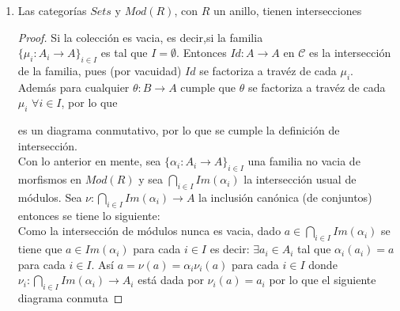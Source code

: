 \documentclass{article}
\begin{document}
\begin{enumerate}[label=\textbf{Ej \arabic*.}]
\begin{proof}
Por último, si $\eta:A_2\times^AA_1\longrightarrow P$ es otro morfismo tal que \\$\eta\mu_1=\beta_1$\,\,y\,\,$\eta\mu_2=\beta_2$, entonces
para cada $(a,b)\in A_2\times^AA_1$
\begin{align*}
\eta(a,b)=\eta[(a,0)+(0,b)]\\
=\eta[\mu_2(a)+\mu_1(b)]\\
=\eta(\mu_2(a))+\eta(\mu_1(b))\\
=\beta_2(a)+\beta_1(b)\\
=\gamma(a,b)
\end{align*}
Por lo que $\gamma=\eta$.
\end{proof}

\item Las categorías $Sets$ y $Mod(R)$, con $R$ un anillo, tienen intersecciones
\begin{proof}
Si la colección es vacia, es decir,si la familia \\ $\{\mu_i\colon A_i\longrightarrow A\}_{i\in I}$ es tal que $I=\emptyset$. Entonces 
$Id\colon A\longrightarrow A$ en $\mathscr{C}$ es la intersección de la familia, pues (por vacuidad) $Id$ se factoriza a travéz de cada $\mu_i$.\\
Además para cualquier $\theta\colon B\longrightarrow A$ cumple que  $\theta$ se factoriza a travéz de cada $\mu_i\,\,\forall i\in I$, por lo que

\centerline{}

es un diagrama conmutativo, por lo que se cumple la definición de intersección.\\

Con lo anterior en mente, sea $\{\alpha_i\colon A_i\longrightarrow A\}_{i\in I}$ una familia no vacia de morfismos en $Mod(R)$ y sea 
$\displaystyle\bigcap_{i\in I}Im(\alpha_i)$ la intersección usual de módulos. 
Sea $\nu\colon \displaystyle\bigcap_{i\in I}Im(\alpha_i)\longrightarrow A$ la inclusión canónica (de conjuntos) entonces
se tiene lo siguiente:\\

Como la intersección de módulos nunca es vacia, dado $a\in\displaystyle\bigcap_{i\in I}Im(\alpha_i)$ se tiene que 
$a\in Im(\alpha_i)$ para cada $i\in I$ es decir: $\exists  a_i\in A_i$ tal que 
$\alpha_i(a_i)=a$ para cada $i\in I$. Así $a=\nu(a)=\alpha_i\nu_i(a)$ para cada $i\in I$ donde $\nu_i\colon \displaystyle\bigcap_{i\in I}Im(\alpha_i)
\longrightarrow A_i$ está dada por $\nu_i(a)=a_i$ por lo que el siguiente diagrama conmuta


\end{proof}
\end{enumerate}
\end{document}
